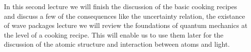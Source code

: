 In this second lecture we will finish the discussion of the basic cooking recipes and discuss a few of the consequences like the uncertainty relation, the existance of wave packages  lecture we will review the foundations of quantum mechanics at the level of a cooking recipe. This will enable us to use them later for the discussion of the atomic structure and interaction between atoms and light.